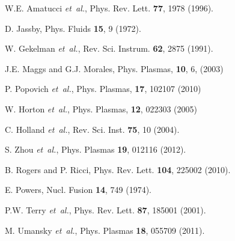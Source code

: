 \documentclass[aps,prl,amsmath,amssymb,preprint,superscriptaddress]{revtex4} %
\begin{document}
\begin{thebibliography}{10}
W.E. Amatucci {\it et~al.}, Phys. Rev. Lett. {\bf 77},  1978  (1996).

D. Jassby, Phys. Fluids {\bf 15},  9  (1972).

W. Gekelman {\it et~al.}, Rev. Sci. Instrum. {\bf 62},  2875  (1991).

J.E. Maggs and G.J. Morales, Phys. Plasmas, {\bf 10}, 6, (2003)

P. Popovich {\it et~al.}, Phys. Plasmas, {\bf 17}, 102107 (2010)

W. Horton {\it et~al.}, Phys. Plasmas, {\bf 12}, 022303 (2005)

C. Holland {\it et~al.}, Rev. Sci. Inst. {\bf 75},  10
  (2004).

S. Zhou {\it et~al.}, Phys. Plasmas {\bf 19},  012116  (2012).

B. Rogers and P. Ricci, Phys. Rev. Lett. {\bf 104},  225002 (2010).

E. Powers, Nucl. Fusion {\bf 14},  749  (1974).

P.W. Terry {\it et~al.}, Phys. Rev. Lett. {\bf 87}, 185001  (2001).

M. Umansky {\it et~al.}, Phys. Plasmas {\bf 18},  055709  (2011).





\end{thebibliography}
\end{document}
